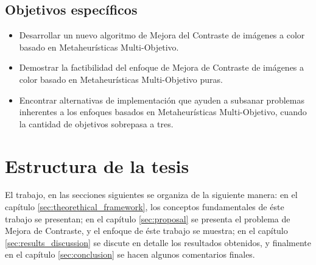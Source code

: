 \subsection{Objetivos específicos}
\begin{itemize}

	\item Desarrollar un nuevo algoritmo de Mejora del Contraste de imágenes a color basado en Metaheurísticas Multi-Objetivo.

	\item Demostrar la factibilidad del enfoque de Mejora de Contraste de imágenes a color basado en Metaheurísticas Multi-Objetivo puras.

	\item Encontrar alternativas de implementación que ayuden a subsanar problemas inherentes a los enfoques basados en Metaheurísticas Multi-Objetivo, cuando la cantidad de objetivos sobrepasa a tres.
	
	
	
	
	
	
	
\end{itemize}

\section{Estructura de la tesis}
El trabajo, en las secciones siguientes se organiza de la siguiente manera: en el capítulo \ref{sec:theorethical_framework}, los conceptos fundamentales de éste trabajo se presentan; en el capítulo \ref{sec:proposal} se presenta el problema de Mejora de Contraste, y el enfoque de éste trabajo se muestra; en el capítulo \ref{sec:results_discussion} se discute en detalle los resultados obtenidos, y finalmente en el capítulo \ref{sec:conclusion} se hacen algunos comentarios finales.
